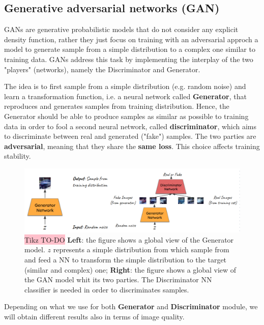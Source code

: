 \subsection{Generative adversarial networks (GAN)}

GANs are generative probabilistic models that do not consider any explicit density function, rather they just focus on training with an adversarial approch a model to generate sample from a simple distribution to a complex one similar to training data. GANs address this task by implementing the interplay of the two "players" (networks), namely the Discriminator and Generator.

The idea is to first sample from a simple distribution (e.g. random noise) and learn a transformation function, i.e. a neural network called \textbf{Generator}, that reproduces and generates samples from training distribution. Hence, the Generator should be able to produce samples as similar as possible to training data in order to fool a second neural network, called \textbf{discriminator}, which aims to discriminate between real and generated ("fake") samples. The two parties are \textbf{adversarial}, meaning that they share the \textbf{same loss}.  This choice affects training stability. 


\begin{figure}[!htbp]
    \centering
    \includegraphics[width=\linewidth]{tikz/GAN.png}
    \caption{{\color{red}\colorbox{pink}{Tikz TO-DO}} \textbf{Left}: the figure shows a global view of the Generator model. $z$ represents a simple distribution from which sample from and feed a NN to transform the simple distribution to the target (similar and complex) one; \textbf{Right}: the figure shows a global view of the GAN model whit its two parties. The Discriminator NN classifier is needed in order to discriminates samples.}
    \label{fig:GAN}
\end{figure}

Depending on what we use for both \textbf{Generator} and \textbf{Discriminator} module, we will obtain different results also in terms of image quality. 

